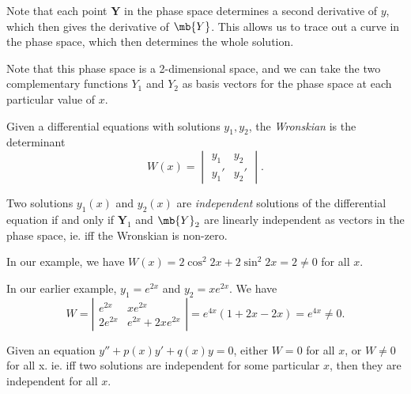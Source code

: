 \documentclass[a4paper]{article}
\begin{document}
  Note that each point $\mathbf{Y}$ in the phase space determines a second derivative of $y$, which then gives the derivative of $\mb{Y}$. This allows us to trace out a curve in the phase space, which then determines the whole solution.

  Note that this phase space is a 2-dimensional space, and we can take the two complementary functions $Y_1$ and $Y_2$ as basis vectors for the phase space at each particular value of $x$.

  \begin{defi}[Wronskian]
    Given a differential equations with solutions $y_1, y_2$, the \emph{Wronskian} is the determinant
    \[
      W(x) = \begin{vmatrix}y_1 & y_2 \\ y_1' & y_2'\end{vmatrix}.
    \]
  \end{defi}
  \begin{defi}
    Two solutions $y_1(x)$ and $y_2(x)$ are \emph{independent} solutions of the differential equation if and only if $\mathbf{Y}_1$  and $\mb{Y}_2$  are linearly independent as vectors in the phase space, ie. iff the Wronskian is non-zero.
  \end{defi}

  In our example, we have $W(x) = 2\cos^2 2x + 2\sin^2 2x = 2 \not= 0$ for all $x$.

  \begin{eg}
    In our earlier example, $y_1 = e^{2x}$ and $y_2 = xe^{2x}$. We have 
    \[
      W = \left|\begin{matrix} e^{2x} & xe^{2x}\\ 2e^{2x} & e^{2x} + 2xe^{2x} \end{matrix}\right| = e^{4x}(1 + 2x - 2x) = e^{4x} \not= 0.
    \]
  \end{eg}

  \begin{thm}
    Given an equation $y'' + p(x)y' + q(x) y = 0$, either $W = 0$ for all $x$, or $W \not= 0$ for all x. ie. iff two solutions are independent for some particular $x$, then they are independent for all $x$.
  \end{thm}
\end{document}
